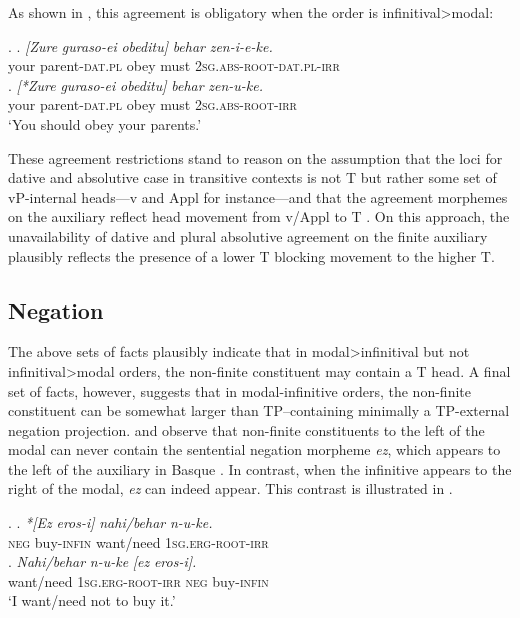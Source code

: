 \documentclass[output=paper]{langscibook}
\begin{document}
	As shown in \Next, this agreement is obligatory when the order is infinitival>modal:

\ex. 	\ag. \textit{[Zure} \textit{guraso-ei}              \textit{obeditu]} \textit{behar}  \textit{zen-i-e-ke.}  \\
             	your parent-\textsc{dat.pl}   obey     must   \textsc{2sg.abs-root-dat.pl-irr}  \\
	\bg.	\textit{[*Zure} \textit{guraso-ei} \textit{obeditu]} \textit{behar} \textit{zen-u-ke.} \\
	    your parent-\textsc{dat.pl}   obey     must   \textsc{2sg.abs-root-irr}  \\
		`You should obey your parents.'  \\
			\citep{etxepare-uribeetxebarria2009}


These agreement restrictions stand to reason on the assumption that the loci for dative and absolutive case in transitive contexts is not T but rather some set of vP-internal heads---v and Appl for instance---and that the agreement morphemes on the auxiliary reflect head movement from v/Appl to T \citep{arregi-molinaazaola2004, rezac2008}.  On this approach, the unavailability of dative and plural absolutive agreement on the finite auxiliary plausibly reflects the presence of a lower T blocking movement to the higher T.

\subsection{Negation}

	 The above sets of facts plausibly indicate that in modal>infinitival but not infinitival>modal orders, the non-finite constituent may contain a T head.  A final set of facts, however, suggests that in modal-infinitive orders, the non-finite constituent can be somewhat larger than TP--containing minimally a TP-external negation projection. \cite{balza2010} and \cite{etxepare-uribeetxebarria2009} observe that non-finite constituents to the left of the modal can never contain the sentential negation morpheme \textit{ez}, which appears to the left of the auxiliary in Basque \citep{laka1990}.  In contrast, when the infinitive appears to the right of the modal, \textit{ez} can indeed appear.  This contrast is illustrated in \Next.  

\ex.	\ag.	\textit{*[Ez} \textit{eros-i]}           \textit{nahi/behar} \textit{n-u-ke.}\\
   	\textsc{neg} buy-\textsc{infin} want/need   \textsc{1sg.erg-root-irr}   \\
\bg.	\textit{Nahi/behar} \textit{n-u-ke} \textit{[ez} \textit{eros-i].}\\
     want/need  \textsc{1sg.erg-root-irr}    \textsc{neg} buy-\textsc{infin} \\
     `I want/need not to buy it.' \\\citep{etxepare-uribeetxebarria2009}
\end{document}
